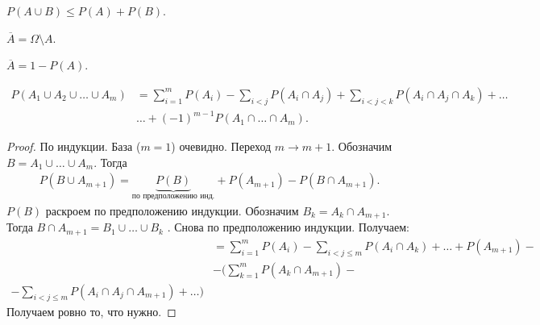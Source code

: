 \begin{crly*}
 $P(A \cup B) \leqslant P(A) + P(B)$.
\end{crly*}

\begin{df*}
 $\overline A = \Omega \setminus A$.
\end{df*}
\begin{prop*}
 $\overline A = 1 - P(A)$.
\end{prop*}

\begin{prop}
 \label{proposition:inclusion_exclusion_formula}
 \begin{align*}
  P(A_1 \cup A_2 \cup \ldots \cup A_m) &= \sum_{i=1}^{m} P(A_i) - \sum_{i < j} P(A_i \cap A_j) + \sum_{i < j < k}  P(A_i \cap A_j \cap A_k) + \ldots \\
  &\ldots + (-1)^{m - 1} P(A_1 \cap \ldots \cap A_m)
 .\end{align*} 
\end{prop}
\begin{proof}
 По индукции. База ($m=1$) очевидно. Переход $m \to m + 1$. Обозначим $B = A_1 \cup \ldots \cup A_m$. Тогда
 \begin{align*}
  P(B \cup A_{m+1}) = \underbrace{P(B)}_{\text{по предположению инд.}} + P(A_{m+1}) - P(B \cap A_{m+1})
 .\end{align*} $P(B)$ раскроем по предположению индукции. Обозначим $B_k = A_k \cap A_{m+1}$. Тогда  $B \cap A_{m+1} = B_1 \cup \ldots \cup B_k$ . Снова по предположению индукции. Получаем:
 \begin{align*}
  &= \sum_{i=1}^{m} P(A_i) - \sum_{i < j \leqslant m} P(A_i \cap A_k) + \ldots + P(A_{m+1}) -\\&- ( \sum_{k=1}^{m} P(A_k \cap A_{m+1}) - \\
  - \sum_{i < j \leqslant m} P(A_i \cap A_j \cap A_{m+1}) + \ldots )
 \end{align*} Получаем ровно то, что нужно.
\end{proof}


